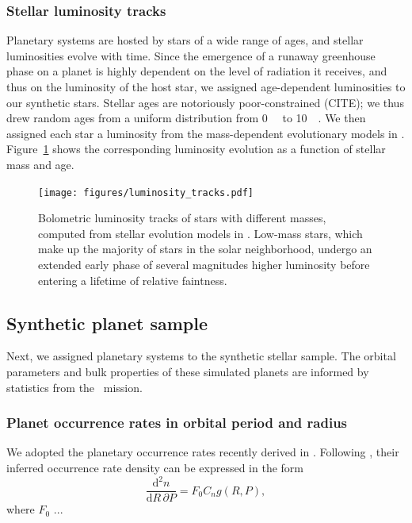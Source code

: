 \documentclass[modern]{aastex631}
\begin{document}
\subsubsection{Stellar luminosity tracks}
    Planetary systems are hosted by stars of a wide range of ages, and stellar luminosities evolve with time.
    Since the emergence of a runaway greenhouse phase on a planet is highly dependent on the level of radiation it receives, and thus on the luminosity of the host star, we assigned age-dependent luminosities to our synthetic stars.
    Stellar ages are notoriously poor-constrained (CITE); we thus drew random ages from a uniform distribution from \SI{0}{\giga\year} to \SI{10}{\giga\year}.
    We then assigned each star a luminosity from the mass-dependent evolutionary models in \citet{Baraffe1998}.
    Figure~\ref{fig:luminosity_tracks} shows the corresponding luminosity evolution as a function of stellar mass and age.
\begin{figure}[ht!]
    \begin{centering}
        \texttt{[image: figures/luminosity\_tracks.pdf]}
        \caption{
            Bolometric luminosity tracks of stars with different masses, computed from stellar evolution models in \citet{Baraffe1998}.
            Low-mass stars, which make up the majority of stars in the solar neighborhood, undergo an extended early phase of several magnitudes higher luminosity before entering a lifetime of relative faintness.
        }
        \label{fig:luminosity_tracks}
    \end{centering}
\end{figure}

\subsection{Synthetic planet sample}
Next, we assigned planetary systems to the synthetic stellar sample.
The orbital parameters and bulk properties of these simulated planets are informed by statistics from the \kepler\ mission.

\subsubsection{Planet occurrence rates in orbital period and radius}
We adopted the planetary occurrence rates recently derived in \citep{Bergsten2022}.
Following \citep{Youdin2011a}, their inferred occurrence rate density can be expressed in the form
\begin{equation}
    \frac{\mathrm{d}^2n}{\mathrm{d}R \, \partial P} = F_0 C_n g(R, P),
\end{equation}
where $F_0$ ...
\end{document}

